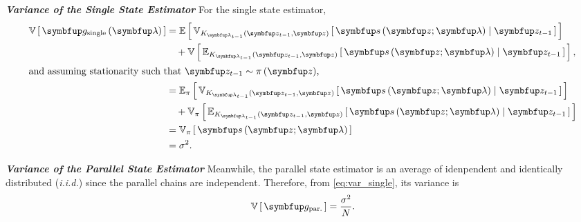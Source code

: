\begin{proofEnd}

  \textit{\textbf{Variance of the Single State Estimator}}\quad
  For the single state estimator,  
  \begin{align}
    \V{\vg_{\text{single}}\left(\vlambda\right)} 
    &= \E{ \Vsub{K_{\vlambda_{t-1}}\left(\vz_{t-1}, \vz\right)}{ \vs\left(\vz; \vlambda\right) \mid \vz_{t-1} }}  \nonumber \\
    &\quad + \V{ \Esub{K_{\vlambda_{t-1}}\left(\vz_{t-1}, \vz\right)}{ \vs\left(\vz; \vlambda\right) \mid \vz_{t-1} } },  \\
    \intertext{and assuming stationarity such that \(\vz_{t-1} \sim \pi\left(\vz\right)\),}
    &= \Esub{\pi}{ \Vsub{K_{\vlambda_{t-1}}\left(\vz_{t-1}, \vz\right)}{ \vs\left(\vz; \vlambda\right) \mid \vz_{t-1} }} \nonumber \\
    &\quad + \Vsub{\pi}{ \Esub{K_{\vlambda_{t-1}}\left(\vz_{t-1}, \vz\right)}{ \vs\left(\vz; \vlambda\right) \mid \vz_{t-1} } }  \\
    &= \Vsub{\pi}{\vs\left(\vz; \vlambda\right)}  \\
    &= \sigma^2.\label{eq:var_single}
  \end{align}

  \textit{\textbf{Variance of the Parallel State Estimator}}\quad
  Meanwhile, the parallel state estimator is an average of idenpendent and identically distributed (\textit{i.i.d.}) since the parallel chains are independent.
  Therefore, from \cref{eq:var_single}, its variance is 
  \begin{align}
    \V{\vg_{\text{par.}}} = \frac{\sigma^2}{N}.
  \end{align}


\end{proofEnd}
